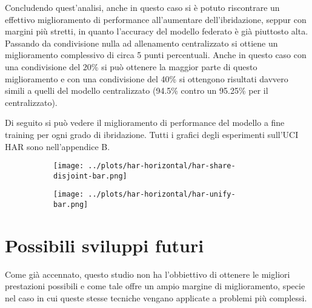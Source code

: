 Concludendo quest'analisi, anche in questo caso si è potuto riscontrare
un effettivo miglioramento di performance all'aumentare dell'ibridazione,
seppur con margini più stretti, in quanto l'accuracy del modello 
federato è già piuttosto alta. Passando da condivisione nulla ad allenamento
centralizzato si ottiene un miglioramento complessivo di circa 5 punti 
percentuali. Anche in questo caso con una condivisione del 20\% si può 
ottenere la maggior parte di questo miglioramento e con una condivisione 
del 40\% si ottengono risultati davvero simili a quelli del modello 
centralizzato (94.5\% contro un 95.25\% per il centralizzato).

Di seguito si può vedere il miglioramento di performance del modello a 
fine training per ogni grado di ibridazione.
Tutti i grafici degli esperimenti sull'UCI HAR sono nell'appendice B.
\begin{figure}[htp]
    \centering
    \begin{subfigure}[b]{0.8\textwidth}
        \centering
        \texttt{[image: ../plots/har-horizontal/har-share-disjoint-bar.png]}
    \end{subfigure}
    \hfill
    \begin{subfigure}[b]{0.8\textwidth}
        \centering
        \texttt{[image: ../plots/har-horizontal/har-unify-bar.png]}
    \end{subfigure}
\end{figure}


\section{Possibili sviluppi futuri}
Come già accennato, questo studio non ha l'obbiettivo di ottenere le 
migliori prestazioni possibili e come tale offre un ampio margine di 
miglioramento, specie nel caso in cui queste stesse tecniche vengano 
applicate a problemi più complessi.  


